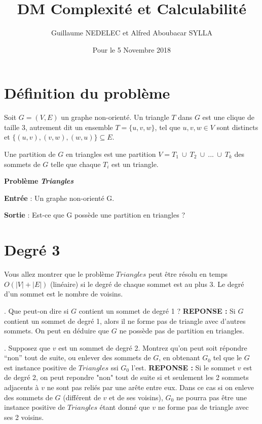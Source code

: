 \documentclass{article}
\title{DM Complexité et Calculabilité}
\author{Guillaume NEDELEC et Alfred Aboubacar SYLLA }
\date{Pour le 5 Novembre 2018}
\begin{document}
\maketitle

\section{Définition du problème}

Soit \textit{$G = (V, E)$} un graphe non-orienté. Un triangle \textit{$T$} dans \textit{$G$} est une clique de taille 3,  autrement dit un ensemble \textit{$T = \{ u, v, w \}$}, tel que \textit{$u, v, w \in V$} sont distincts et \textit{$\{(u, v),(v, w),(w, u)\} \subseteq E$}.

Une partition de \textit{$G$} en triangles est une partition \textit{$V = T_{1} \: \cup \: T_{2} \: \cup \: . . . \: \cup \: T_{k}$} des sommets de \textit{$G$} telle que chaque \textit{$T_{i}$} est un triangle.

\smallbreak

\textbf{Problème} \textbf{\textit{Triangles}}

\textbf{Entrée} : Un graphe non-orienté G.

\textbf{Sortie} : Est-ce que G possède une partition en triangles ?

\section{Degré 3 }

Vous allez montrer que le problème $Triangles$ peut être résolu en temps $O(|V| + |E|)$ (linéaire) si le degré de chaque sommet est au plus 3. Le degré d’un sommet est le nombre de voisins.
\bigbreak

. Que peut-on dire si $G$ contient un sommet de degré 1 ?
\smallbreak
\noindent \textbf{REPONSE :} Si $G$ contient un sommet de degré 1, alors il ne forme pas de triangle avec d'autres sommets. On peut en déduire que $G$ ne possède pas de partition en triangles.
\bigbreak

. Supposez que $v$ est un sommet de degré 2. Montrez qu’on peut soit répondre “non” tout de suite, ou enlever des sommets de $G$, en obtenant $G_{0}$ tel que le $G$ est instance positive de $Triangles$ ssi $G_{0}$ l’est.
\smallbreak
\noindent \textbf{REPONSE :} Si le sommet $v$ est de degré 2, on peut repondre "non" tout de suite si et seulement les 2 sommets adjacents à $v$ ne sont pas reliés par une arête entre eux. Dans ce cas si on enleve des sommets de $G$ (différent de $v$ et de ses voisins), $G_{0}$ ne pourra pas être une instance positive de $Triangles$ étant donné que $v$ ne forme pas de triangle avec ses 2 voisins.
\bigbreak
\end{document}
